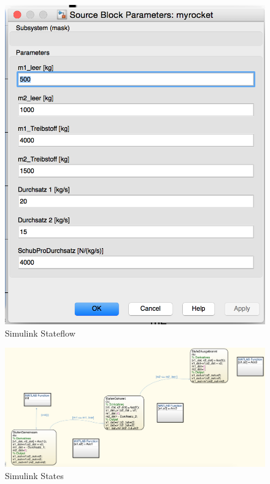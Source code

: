 \documentclass[10pt,a4paper]{article}
\begin{document}
	\begin{figure}[H]
 	 		\centering
 	 		\includegraphics[width=1\textwidth]{../aufgabe1/screens/rocket_para.png}
 	 		\caption{Simulink Stateflow}
 	 	\end{figure}

		\begin{figure}[H]
 	 		\centering
 	 		\includegraphics[width=1\textwidth]{../aufgabe1/screens/rocket_state.png}
 	 		\caption{Simulink States}
 	 	\end{figure}
 	 	
\end{document}
